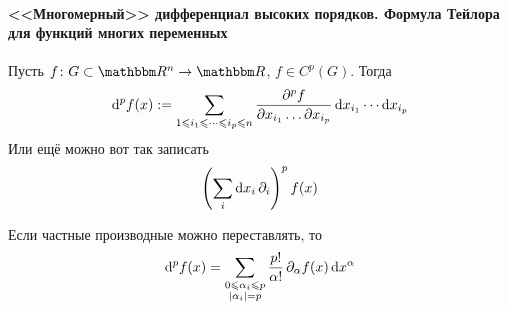 \documentclass[12pt,timbord]{../../../notes}
\begin{document}
\paragraph{<<Многомерный>> дифференциал высоких порядков. Формула Тейлора для функций многих
переменных}
\label{par:diffspace::highdifftaylor}

\begin{defn}\label{defn:diffspace::highdiff}
  Пусть $f \colon G \subset \R^n \to \R$, $f\in C^p(G)$. Тогда
  \[  
    \mathrm{d}^p f(x) := \sum_{1 \leqslant i_1 \leqslant \dotsb \leqslant i_p \leqslant n}
    \frac{\partial^p f}{\partial x_{i_1} \dotso \partial x_{i_p}} \, \mathrm{d} x_{i_1} \dotsm \mathrm{d} x_{i_p}
  \]
  Или ещё можно вот так записать
  \[
    \left(\sum_i \mathrm{d} x_i\, \partial_i \right)^p f(x)
  \]
\end{defn}

\begin{stat}\label{stat:diffspace::highdiff::binom}
  Если частные производные можно переставлять, то
  \[
    \mathrm{d}^p f(x) = \sum_{\substack{0 \leqslant \alpha_i \leqslant p \\ |\alpha_i| = p}} 
    \frac{p!}{\alpha!} \, \partial_\alpha f(x) \,\mathrm{d} x ^ \alpha
  \]
\end{stat}
\end{document}
